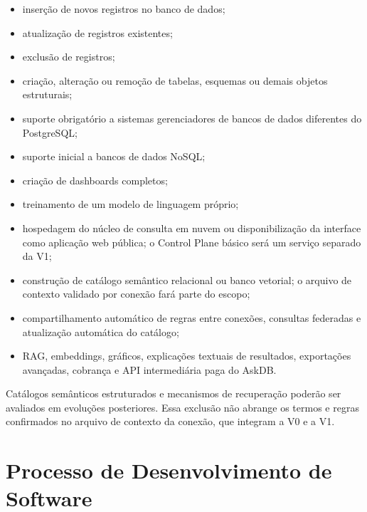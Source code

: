 \begin{itemize}

    \item inserção de novos registros no banco de dados;

    \item atualização de registros existentes;

    \item exclusão de registros;

    \item criação, alteração ou remoção de tabelas, esquemas ou demais objetos estruturais;

    \item suporte obrigatório a sistemas gerenciadores de bancos de dados diferentes do PostgreSQL;

    \item suporte inicial a bancos de dados NoSQL;

    \item criação de dashboards completos;

    \item treinamento de um modelo de linguagem próprio;

    \item hospedagem do núcleo de consulta em nuvem ou disponibilização da interface como aplicação web pública; o Control Plane básico será um serviço separado da V1;

    \item construção de catálogo semântico relacional ou banco vetorial; o arquivo de contexto validado por conexão fará parte do escopo;

    \item compartilhamento automático de regras entre conexões, consultas federadas e atualização automática do catálogo;

    \item RAG, embeddings, gráficos, explicações textuais de resultados, exportações avançadas, cobrança e API intermediária paga do AskDB.

\end{itemize}

Catálogos semânticos estruturados e mecanismos de recuperação poderão ser avaliados em evoluções posteriores. Essa exclusão não abrange os termos e regras confirmados no arquivo de contexto da conexão, que integram a V0 e a V1.


\section{Processo de Desenvolvimento de Software}

